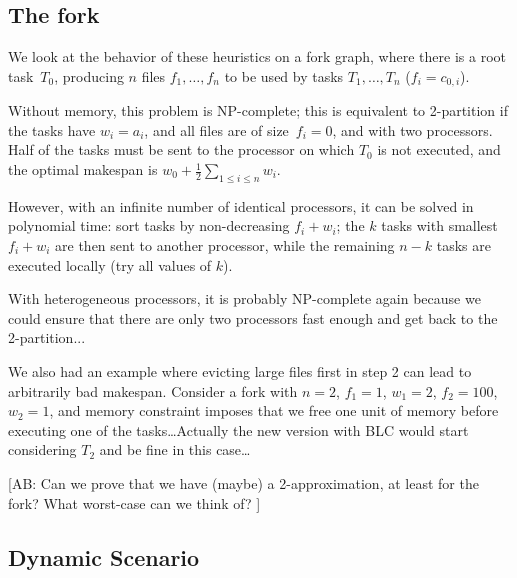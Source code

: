 \documentclass[conference]{IEEEtran}
\newcommand{\AB}[1]{{\color{purple}[AB: #1]}}
\begin{document}
    \subsection{The fork}
    We look at the behavior of these heuristics on a fork graph,
    where there is a root task~$T_0$, producing $n$ files $f_1, \ldots, f_n$
    to be used by tasks $T_1, \ldots, T_n$ ($f_i = c_{0,i}$).

    Without memory, this problem is NP-complete; this is equivalent
    to 2-partition if the tasks have $w_i=a_i$, and all files are of size~$f_i=0$,
    and with two processors. Half of the tasks must be sent to the processor
    on which $T_0$ is not executed, and the optimal makespan is
    $w_0+\frac{1}{2}\sum_{1\leq i \leq n} w_i$.

    However, with an infinite number of identical processors, it can be
    solved in polynomial time: sort tasks by non-decreasing $f_i+w_i$;
    the $k$ tasks with smallest $f_i+w_i$ are then sent to another processor,
    while the remaining $n-k$ tasks are executed locally (try all values of $k$).

    With heterogeneous processors, it is probably NP-complete again
    because we could ensure that there are only two processors fast enough
    and get back to the 2-partition...

    We also had an example where evicting large files first in step 2
    can lead to arbitrarily bad makespan. Consider a fork with $n=2$,
    $f_1=1$, $w_1=2$, $f_2=100$, $w_2=1$, and memory constraint
    imposes that we free one unit of memory before executing one
    of the tasks\ldots Actually the new version with BLC would start
    considering $T_2$ and be fine in this case\ldots


    \AB{Can we prove that we have (maybe) a 2-approximation,
        at least for the fork? What worst-case can we think of? }


    \subsection{Dynamic Scenario}
\end{document}
